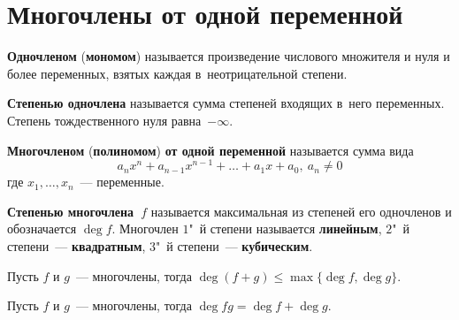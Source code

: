 \section{Многочлены от одной переменной}
  \textbf{Одночленом} (\textbf{мономом}) называется произведение числового множителя и нуля и более переменных, взятых каждая в~неотрицательной степени.

\textbf{Степенью одночлена} называется сумма степеней входящих в~него переменных.
Степень тождественного нуля равна~$-\infty$.

  \textbf{Многочленом} (\textbf{полиномом}) \textbf{от одной переменной} называется сумма вида
\begin{equation*}
a_n x^n + a_{n-1} x^{n-1} + \ldots + a_1 x + a_0, \ a_n \neq 0
\end{equation*}
где $x_1, \ldots, x_n$~--- переменные.

 \textbf{Степенью многочлена~$f$} называется максимальная из степеней его одночленов и обозначается $\deg f$.
Многочлен $1$"~й степени называется \textbf{линейным}, $2$"~й степени~--- \textbf{квадратным}, $3$"~й степени~--- \textbf{кубическим}.

\begin{statement}
Пусть $f$ и $g$~--- многочлены, тогда $\deg (f + g) \leqslant \max \{ \deg f, \deg g \}$.
\end{statement}
\begin{statement}
Пусть $f$ и $g$~--- многочлены, тогда $\deg fg = \deg f + \deg g$.
\end{statement}

